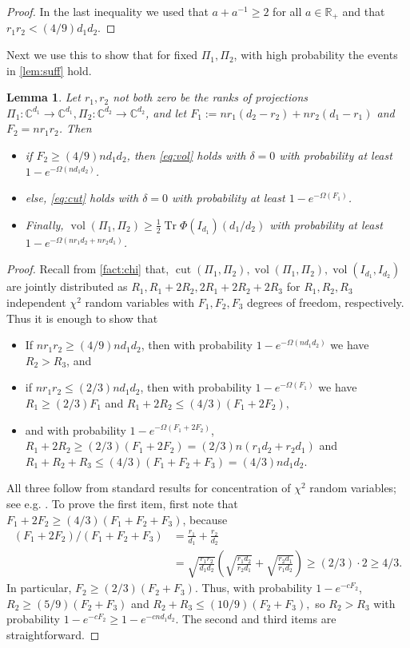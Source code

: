\documentclass[aos]{imsart}
\newtheorem{lemma}[theorem]{Lemma}
\theoremstyle{definition}
\numberwithin{equation}{section}
\DeclareMathOperator{\vol}{vol}
\DeclareMathOperator{\cut}{cut}
\DeclareMathOperator{\tr}{Tr}
\newcommand{\R}{{\mathbb{R}}}
\newcommand{\C}{{\mathbb{C}}}
\begin{document}
\begin{appendix}
\begin{proof}
In the last inequality we used that $a + a^{-1} \geq 2$ for all $a \in \R_+$ and that $r_1 r_2 < (4/9) d_1 d_2$. \end{proof}


Next we use this to show that for fixed $\Pi_1, \Pi_2$, with high probability the events in \cref{lem:suff} hold.
\begin{lemma}\label{lem:probabilities}
Let $r_1, r_2$ not both zero be the ranks of projections $\Pi_1: \C^{d_1} \to \C^{d_1}, \Pi_2: \C^{d_2} \to \C^{d_2}$, and let $F_1:= n r_1(d_2 - r_2) + n r_2(d_1-r_1)$ and $F_2 = n r_1 r_2$. Then
\begin{itemize}
\item if $F_2 \geq (4/9) n d_1 d_2$, then \cref{eq:vol} holds with $\delta = 0$ with probability at least $1 - e^{-\Omega( n d_1 d_2)}$.
\item else, \cref{eq:cut} holds with $\delta = 0$ with probability at least $1 - e^{-\Omega( F_1)}$.
\item Finally, $\vol(\Pi_1, \Pi_2) \geq \frac{1}{2}\tr \Phi(I_{d_1}) (d_1/d_2)$ with probability at least $1 - e^{- \Omega(n r_1 d_2 + n r_2 d_1)}$.
\end{itemize}
\end{lemma}


\begin{proof}
Recall from \cref{fact:chi} that, $\cut(\Pi_1, \Pi_2), \vol(\Pi_1, \Pi_2), \vol(I_{d_1}, I_{d_2})$ are jointly distributed as $R_1, R_1 + 2R_2, 2R_1 + 2R_2 + 2R_3$ for $R_1, R_2, R_3$ independent $\chi^2$ random variables with $F_1, F_2, F_3$ degrees of freedom, respectively. Thus it is enough to show that
\begin{itemize}
\item If $nr_1 r_2 \geq (4/9) n d_1 d_2$, then with probability $1 - e^{- \Omega( n d_1 d_2)}$ we have $R_2 > R_3$, and
\item if $nr_1 r_2 \leq (2/3) n d_1 d_2$, then with probability $1 - e^{- \Omega(F_1)}$ we have $R_1 \geq (2/3) F_1$ and $R_1 + 2R_2 \leq (4/3) (F_1 + 2 F_2),$
\item and with probability $1 - e^{- \Omega(F_1 + 2 F_2)}$, $R_1 + 2R_2 \geq (2/3) (F_1 + 2 F_2) = (2/3) n (r_1 d_2 + r_2 d_1)$ and $R_1 + R_2 + R_3 \leq (4/3)(F_1 + F_2 + F_3) = (4/3)n d_1 d_2$.
\end{itemize}
All three follow from standard results for concentration of $\chi^2$ random variables; see e.g. \cite{W19}. To prove the first item, first note that $F_1 + 2 F_2 \geq (4/3)(F_1 + F_2 + F_3)$, because
\begin{align*}
(F_1 + 2 F_2)/( F_1 + F_2 + F_3) &= \frac{r_1}{d_1} + \frac{r_2}{d_2}\\
 &= \sqrt{ \frac{r_1 r_2}{d_1 d_2}}\left( \sqrt{ \frac{r_1 d_2}{r_2 d_1}} + \sqrt{ \frac{r_2 d_1}{r_1 d_2}}\right) \geq (2/3) \cdot 2 \geq 4/3.
\end{align*}
In particular, $F_2 \geq (2/3)(F_2 + F_3)$. Thus, with probability $1 - e^{- c F_2}$, $R_2 \geq (5/9) (F_2 + F_3)$ and $R_2 + R_3 \leq (10/9) (F _2 + F_3),$ so $R_2 > R_3$ with probability $1 - e^{- c F_2} \geq 1 - e^{- c n d_1 d_2}$. The second and third items are straightforward.
\end{proof}


\end{appendix}
\end{document}
